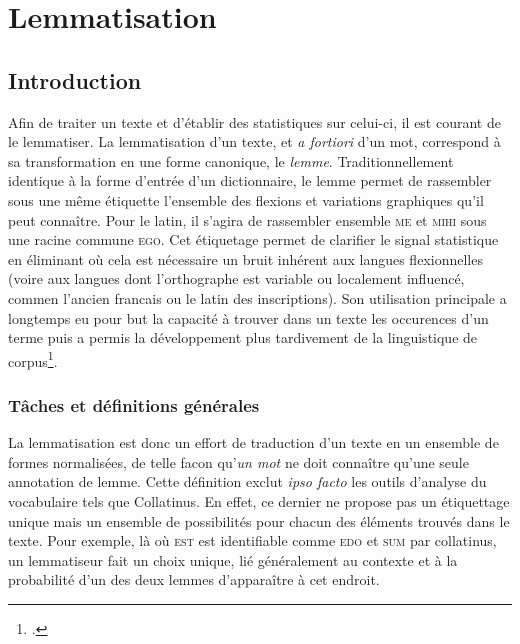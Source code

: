 \chapter{Lemmatisation}
\label{sec:lemmatiseurs}

\section{Introduction}
\label{subsec:lemma_intro}

Afin de traiter un texte et d'établir des statistiques sur celui-ci, il est courant de le lemmatiser. La lemmatisation d'un texte, et \textit{a fortiori} d'un mot, correspond à sa transformation en une forme canonique, le \textit{lemme}. Traditionnellement identique à la forme d'entrée d'un dictionnaire, le lemme permet de rassembler sous une même étiquette l'ensemble des flexions et variations graphiques qu'il peut connaître. Pour le latin, il s'agira de rassembler ensemble \textsc{me} et \textsc{mihi} sous une racine commune \textsc{ego}. Cet étiquetage permet de clarifier le signal statistique en éliminant où cela est nécessaire un bruit inhérent aux langues flexionnelles (voire aux langues dont l'orthographe est variable ou localement influencé, commen l'ancien francais ou le latin des inscriptions). Son utilisation principale a longtemps eu pour but la capacité à trouver dans un texte les occurences d'un terme puis a permis la développement plus tardivement de la linguistique de corpus\footcite{mellet2002atouts}.

\subsection{Tâches et définitions générales}

La lemmatisation est donc un effort de traduction d'un texte en un ensemble de formes normalisées, de telle facon qu'\textit{un mot} ne doit connaître qu'une seule annotation de lemme. Cette définition exclut \textit{ipso facto} les outils d'analyse du vocabulaire tels que Collatinus. En effet, ce dernier ne propose pas un étiquettage unique mais un ensemble de possibilités pour chacun des éléments trouvés dans le texte. Pour exemple, là où \textsc{est} est identifiable comme \textsc{edo} et \textsc{sum} par collatinus, un lemmatiseur fait un choix unique, lié généralement au contexte et à la probabilité d'un des deux lemmes d'apparaître à cet endroit.

